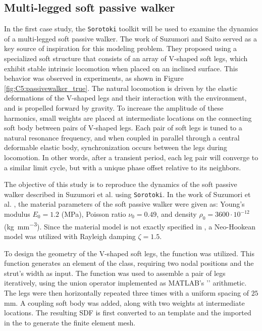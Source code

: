 \subsection{Multi-legged soft passive walker}
\label{sec:C5:suzumori_walker}
In the first case study, the \texttt{Sorotoki} toolkit will be used to examine the dynamics of a multi-legged soft passive walker. The work of Suzumori and Saito \cite{Suzumori2008Sep} served as a key source of inspiration for this modeling problem. They proposed using a specialized soft structure that consists of an array of V-shaped soft legs, which exhibit stable intrinsic locomotion when placed on an inclined surface. This behavior was observed in experiments, as shown in Figure \ref{fig:C5:passivewalker_true}. The natural locomotion is driven by the elastic deformations of the V-shaped legs and their interaction with the environment, and is propelled forward by gravity. To increase the amplitude of these harmonics, small weights are placed at intermediate locations on the connecting soft body between pairs of V-shaped legs. Each pair of soft legs is tuned to a natural resonance frequency, and when coupled in parallel through a central deformable elastic body, synchronization occurs between the legs during locomotion. In other words, after a transient period, each leg pair will converge to a similar limit cycle, but with a unique phase offset relative to its neighbors.

The objective of this study is to reproduce the dynamics of the soft passive walker described in Suzumori et al. \cite{Suzumori2008Sep} using \texttt{Sorotoki}. In the work of Suzumori et al. \cite{Suzumori2008Sep}, the material parameters of the soft passive walker were given as: Young's modulus $E_0 = 1.2$ (\si{\mega \pascal}), Poisson ratio $\nu_0 = 0.49$, and density $\rho_0 = 3600 \cdot 10^{-12}$ (\si{\kilo \gram \per \milli \metre \cubed}). Since the material model is not exactly specified in \cite{Suzumori2008Sep}, a Neo-Hookean model was utilized with Rayleigh damping $\zeta = 1.5$.

To design the geometry of the V-shaped soft legs, the  function was utilized. This function generates an element of the  class, requiring two nodal positions  and the strut's width  as input. The function was used to assemble a pair of legs iteratively, using the union operator implemented as {MATLAB}'s '\code{+}' arithmetic. The legs were then horizontally repeated three times with a uniform spacing of $25$ \si{\milli \metre}. A coupling soft body was added, along with two weights at intermediate locations. The resulting SDF is first converted to an  template and the imported in the  to generate the finite element mesh. %

